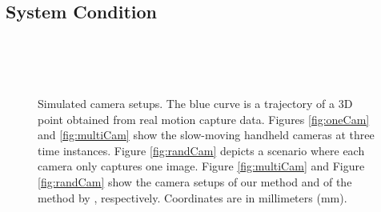 \subsection{System Condition} \label{sec:system_condition}
\begin{figure}[]
\centering
{}\\
\\
\\
\caption{Simulated camera setups. The blue curve is a trajectory of a 3D point obtained from real motion capture data. Figures \ref{fig:oneCam} and \ref{fig:multiCam} show the slow-moving handheld cameras at three time instances. Figure \ref{fig:randCam} depicts a scenario where each camera only captures one image.
Figure \ref{fig:multiCam} and Figure \ref{fig:randCam} show the camera setups of our method and of the method by \citet{zheng2014joint}, respectively. Coordinates are in millimeters (mm).
}
\label{fig:condition}
\end{figure}

